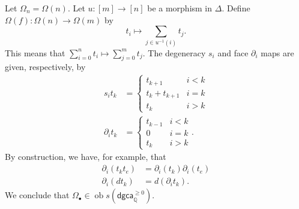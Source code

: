 \documentclass[10pt,letterpaper,cm]{nupset}
\theoremstyle{definition}
\theoremstyle{theorem}
\theoremstyle{remark}
\newcommand{\Q}{\mathbb Q}
\newcommand{\1}{\mathbb{1}}
\newcommand{\dgca}{\mathsf{dgca}}
\newcommand{\0}{\vec 0}
\DeclareMathOperator{\ob}{ob}
\begin{document}
\medskip

Let $\Omega_n = \Omega(n)$. Let $u : \left[m\right] \to \left[n\right] $ be a morphism in $\Delta$. Define $\Omega(f) : \Omega(n) \to \Omega(m)$ by 
\[
t_i  \mapsto \sum_{j \in u^{-1}(i)}  t_j
.\] This means that $\sum_{i=0}^n{t_i} \mapsto \sum_{j=0}^m t_j$. The degeneracy $s_i$ and face $\partial_i$  maps are given, respectively, by
\begin{align*}
s_i{t_k} & = \begin{cases} t_{k+1} & i < k \\ t_k + t_{k+1} & i = k \\ t_k & i > k \end{cases}
\\ \partial_i{t_k} & = \begin{cases}
t_{k-1} & i < k
\\ 0 & i = k
\\ t_k & i > k
\end{cases}.
\end{align*} 
By construction, we have, for example, that
\begin{align*}
\partial_i(t_k t_e) & = \partial_i(t_k)\partial_i(t_e)
\\ \partial_i(d{t_k}) & = d(\partial_i{t_k})
.\end{align*} 
We conclude that $\Omega_{\bullet} \in \ob{s(\dgca_{\Q}^{\geq 0})}$.

\medskip
\end{document}
